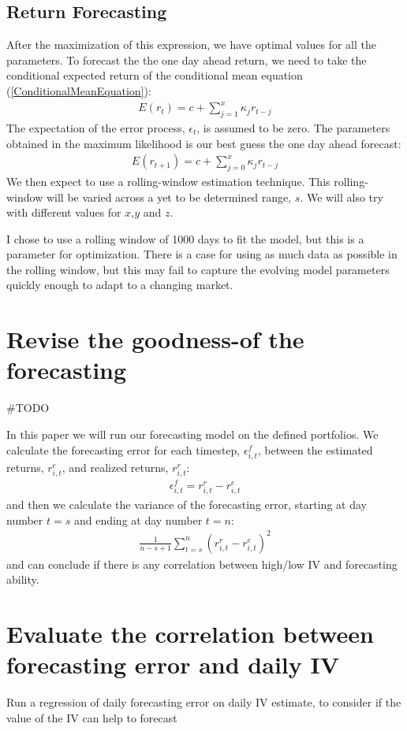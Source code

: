 \subsection*{Return Forecasting}

After the maximization of this expression, we have optimal values for all the parameters. To forecast the the one day ahead return, we need to take the conditional expected return of the conditional mean equation (\ref{ConditionalMeanEquation}):
\begin{align} 
    E(r_{t})=c+\sum_{j=1}^x\kappa_j r_{t-j}
\end{align}
The expectation of the error process, $\epsilon_t$, is assumed to be zero. The parameters obtained in the maximum likelihood is our best guess the one day ahead forecast:
\begin{align} 
    E(r_{t+1})=c+\sum_{j=0}^x\kappa_j r_{t-j}
\end{align}
We then expect to use a rolling-window estimation technique. This rolling-window will be varied across a yet to be determined range, $s$. We will also try with different values for $x$,$y$ and $z$. 

I chose to use a rolling window of 1000 days to fit the model, but this is a parameter for optimization. There is a case for using as much data as possible in the rolling window, but this may fail to capture the evolving model parameters quickly enough to adapt to a changing market.

\section*{Revise the goodness-of the forecasting}

#TODO 



In this paper we will run our forecasting model on the defined portfolios. We calculate the forecasting error for each timestep, $\epsilon_{i,t}^{f}$, between the estimated returns, $r_{i,t}^{e}$, and realized returns, $r_{i,t}^{r}$:
\begin{align}
    \epsilon_{i,t}^{f} = r_{i,t}^{r} - r_{i,t}^{e}
\end{align}
and then we calculate the variance of the forecasting error, starting at day number $t=s$ and ending at day number $t=n$:
\begin{align}
    \frac{1}{n-s+1}\sum_{t=s}^{n}(r_{i,t}^{r} - r_{i,t}^{e})^{2}
\end{align}
and can conclude if there is any correlation between high/low IV and forecasting ability.

\section*{Evaluate the correlation between forecasting error and daily IV} Run a regression of daily forecasting error on daily IV estimate, to consider if the value of the IV can help to forecast

